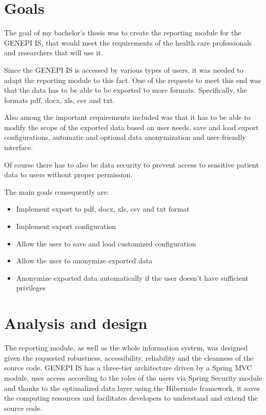 \documentclass[thesis=B,english]{FITthesis}[2012/10/20]
\begin{document}
\chapter{Goals}

The goal of my bachelor's thesis was to create the reporting module for the GENEPI IS, that would meet the requirements of the health care professionals and researchers that will use it.

Since the GENEPI IS is accessed by various types of users, it was needed to adapt the reporting module to this fact. One of the requests to meet this end was that the data has to be able to be exported to more formats. Specifically, the formats pdf, docx, xls, csv and txt.

Also among the important requirements included was that it has to be able to modify the scope of the exported data based on user needs, save and load export configurations, automatic and optional data anonymization and user-friendly interface.

Of course there has to also be data security to prevent access to sensitive patient data to users without proper permission.

The main goals consequently are:
\begin{itemize}
  	\item Implement export to pdf, docx, xls, csv and txt format
  	\item Implement export configuration
  	\item Allow the user to save and load customized configuration
 	\item Allow the user to anonymize exported data 
 	\item Anonymize exported data automatically if the user doesn't have sufficient privileges
\end{itemize}

\chapter{Analysis and design}
The reporting module, as well as the whole information system, was designed given the requested robustness, accessibility, reliability and the cleanness of the source code. GENEPI IS has a three-tier architecture driven by a Spring MVC module, uses access according to the roles of the users via Spring Security module and thanks to the optimalized data layer using the Hibernate framework, it saves the computing resources and facilitates developers to understand and extend the source code.
\end{document}

